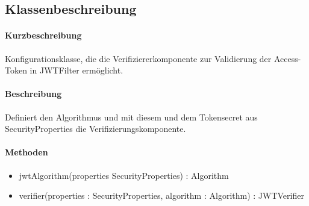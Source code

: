 \subsection*{Klassenbeschreibung}%
\paragraph*{Kurzbeschreibung}
Konfigurationsklasse, die die Verifiziererkomponente zur Validierung der Access-Token in JWTFilter ermöglicht.
\paragraph*{Beschreibung}
Definiert den Algorithmus und mit diesem und dem Tokensecret aus \dq SecurityProperties\dq{} die Verifizierungskomponente.
\paragraph*{Methoden}
\begin{itemize}
	\item jwtAlgorithm(properties SecurityProperties) : Algorithm
    \item verifier(properties : SecurityProperties, algorithm : Algorithm) : JWTVerifier
\end{itemize}	
